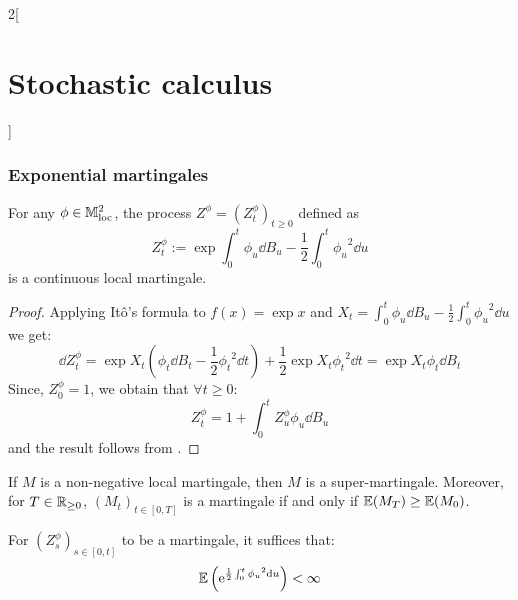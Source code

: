 \documentclass[../../../main_math.tex]{subfiles}
\begin{document}
\begin{multicols}{2}[\section{Stochastic calculus}]
  \subsubsection{Exponential martingales}
  \begin{lemma}
    For any $\phi\in\mathbb{M}^2_{\text{loc}}$, the process $Z^\phi={(Z_t^\phi)}_{t\geq 0}$ defined as
    $$
      Z_t^\phi:=\exp{\int_0^t \phi_u\dd{B_u}-\frac{1}{2}\int_0^t{\phi_u}^2\dd{u}}
    $$
    is a continuous local martingale.
  \end{lemma}
  \begin{proof}
    Applying Itô's formula to $f(x)=\exp{x}$ and $X_t=\int_0^t \phi_u\dd{B_u}-\frac{1}{2}\int_0^t{\phi_u}^2\dd{u}$ we get:
    \begin{equation*}
      \dd{Z^\phi_t} = \exp{X_t}\left( \phi_t\dd{B_t}-\frac{1}{2}{\phi_t}^2\dd{t}\right)+\frac{1}{2}\exp{X_t}{\phi_t}^2\dd{t}= \exp{X_t}\phi_t\dd{B_t}
    \end{equation*}
    Since, $Z^\phi_0=1$, we obtain that $\forall t \geq 0$:
    \begin{equation*}
      Z^\phi_t=1+\int_0^t Z^\phi_u\phi_u\dd{B_u}
    \end{equation*}
    and the result follows from .
  \end{proof}
  \begin{lemma}
    If $M$ is a non-negative local martingale, then $M$ is a super-martingale. Moreover, for $T\in \mathbb{R}_{\geq 0}$, ${(M_t)}_{t\in[0,T]}$ is a martingale if and only if $\mathbb{E}(M_T)\geq \mathbb{E}(M_0)$.
  \end{lemma}
  \begin{theorem}
    For ${(Z^\phi_s)}_{s\in[0,t]}$ to be a martingale, it suffices that:
    $$
      \mathbb{E}\left(\mathrm{e}^{\frac{1}{2}\int_0^t{\phi_u}^2\dd{u}}\right)<\infty
    $$
  \end{theorem}
\end{multicols}
\end{document}

